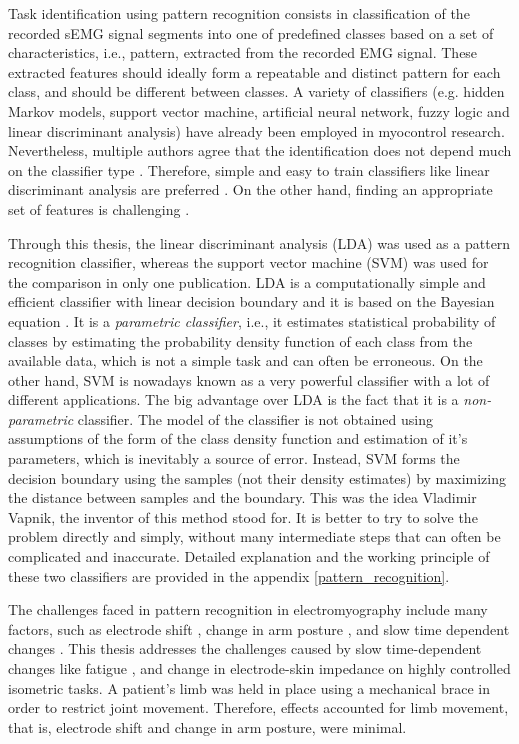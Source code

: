 Task identification using pattern recognition consists in classification of the recorded sEMG signal segments into one of predefined classes based on a set of characteristics, i.e., pattern, extracted from the recorded EMG signal. These extracted features should ideally form a repeatable and distinct pattern for each class, and should be different between classes. A variety of classifiers (e.g. hidden Markov models, support vector machine, artificial neural network, fuzzy logic and linear discriminant analysis) \citep{Oskoei2007} have already been employed in myocontrol research. Nevertheless, multiple authors agree that the identification does not depend much on the classifier type \citep{Hargrove2007, Zhang2012, Hakonen2015}. Therefore, simple and easy to train classifiers like linear discriminant analysis are preferred \citep{Li2010, Englehart1999, Tkach2010, Li2014, Hakonen2015}. On the other hand, finding an appropriate set of features is challenging \citep{Englehart1999, Tkach2010, Liu2013}.

Through this thesis, the linear discriminant analysis (LDA) was used as a pattern recognition classifier, whereas the support vector machine (SVM) was used for the comparison in only one publication. LDA is a computationally simple and efficient classifier with linear decision boundary and it is based on the Bayesian equation \citep{McLachlan2004}. It is a \emph{parametric classifier}, i.e., it estimates statistical probability of classes by estimating the probability density function of each class from the available data, which is not a simple task and can often be erroneous. On the other hand, SVM \citep{Cortes1995} is nowadays known as a very powerful classifier with a lot of different applications. The big advantage over LDA is the fact that it is a \emph{non-parametric} classifier. The model of the classifier is not obtained using assumptions of the form of the class density function and estimation of it's parameters, which is inevitably a source of error. Instead, SVM forms the decision boundary using the samples (not their density estimates) by maximizing the distance between samples and the boundary. This was the idea Vladimir Vapnik, the inventor of this method stood for. It is better to try to solve the problem directly and simply, without many intermediate steps that can often be complicated and inaccurate. Detailed explanation and the working principle of these two classifiers are provided in the appendix \ref{pattern_recognition}.

The challenges faced in pattern recognition in electromyography include many factors, such as electrode shift \citep{Hargrove2008, Young2011}, change in arm posture \citep{Fougner2011}, and slow time dependent changes \citep{Farina2014}. This thesis addresses the challenges caused by slow time-dependent changes like fatigue \citep{Tkach2010}, and change in electrode-skin impedance \citep{Clancy2002b} on highly controlled isometric tasks. A patient's limb was held in place using a mechanical brace in order to restrict joint movement. Therefore, effects accounted for limb movement, that is, electrode shift and change in arm posture, were minimal.  


